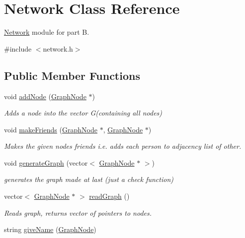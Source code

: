\hypertarget{classNetwork}{\section{\-Network \-Class \-Reference}
\label{classNetwork}
}


\hyperlink{classNetwork}{\-Network} module for part \-B.  




{\ttfamily \#include $<$network.\-h$>$}

\subsection*{\-Public \-Member \-Functions}
\begin{DoxyCompactItemize}
\item 
void \hyperlink{classNetwork_af1d5854ff8e43d83623af7703ca95264}{add\-Node} (\hyperlink{structGraphNode}{\-Graph\-Node} $\ast$)
\begin{DoxyCompactList}\small\item\em \-Adds a node into the vector \-G(containing all nodes) \end{DoxyCompactList}\item 
void \hyperlink{classNetwork_a0981eb57d7ecb023f0abb63f5d9824e3}{make\-Friends} (\hyperlink{structGraphNode}{\-Graph\-Node} $\ast$, \hyperlink{structGraphNode}{\-Graph\-Node} $\ast$)
\begin{DoxyCompactList}\small\item\em \-Makes the given nodes friends i.\-e. adds each person to adjacency list of other. \end{DoxyCompactList}\item 
void \hyperlink{classNetwork_a7028b8c3023670df31383c49952d5e81}{generate\-Graph} (vector$<$ \hyperlink{structGraphNode}{\-Graph\-Node} $\ast$ $>$)
\begin{DoxyCompactList}\small\item\em generates the graph made at last (just a check function) \end{DoxyCompactList}\item 
vector$<$ \hyperlink{structGraphNode}{\-Graph\-Node} $\ast$ $>$ \hyperlink{classNetwork_a39840cba43a0df9d537ac6c713faf787}{read\-Graph} ()
\begin{DoxyCompactList}\small\item\em \-Reads graph, returns vector of pointers to nodes. \end{DoxyCompactList}\item 
\hypertarget{classNetwork_a3acd7cd5049f7cc0230dda97c522e661}{string \hyperlink{classNetwork_a3acd7cd5049f7cc0230dda97c522e661}{give\-Name} (\hyperlink{structGraphNode}{\-Graph\-Node})}\label{classNetwork_a3acd7cd5049f7cc0230dda97c522e661}


\end{DoxyCompactItemize}
